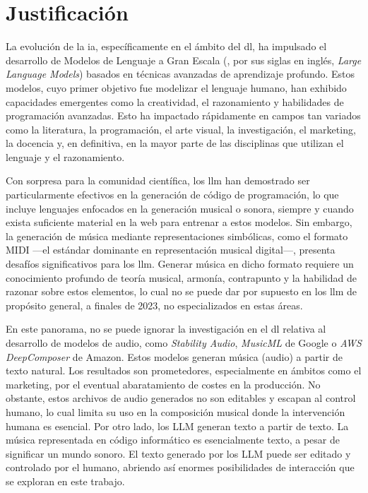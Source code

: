 \chapter{Justificación}

La evolución de la \gls{ia}, específicamente en el ámbito del \gls{dl}, ha impulsado el desarrollo de Modelos de Lenguaje a Gran Escala (, por sus siglas en inglés, \textit{Large Language Models}) basados en técnicas avanzadas de aprendizaje profundo. Estos modelos, cuyo primer objetivo fue modelizar el lenguaje humano, han exhibido capacidades emergentes como la creatividad, el razonamiento y habilidades de programación avanzadas. Esto ha impactado rápidamente en campos tan variados como la literatura, la programación, el arte visual, la investigación, el marketing, la docencia y, en definitiva, en la mayor parte de las disciplinas que utilizan el lenguaje y el razonamiento.

Con sorpresa para la comunidad científica, los \gls{llm} han demostrado ser particularmente efectivos en la generación de código de programación, lo que incluye lenguajes enfocados en la generación musical o sonora, siempre y cuando exista suficiente material en la web para entrenar a estos modelos. Sin embargo, la generación de música mediante representaciones simbólicas, como el formato MIDI —el estándar dominante en representación musical digital—, presenta desafíos significativos para los \gls{llm}. Generar música en dicho formato requiere un conocimiento profundo de teoría musical, armonía, contrapunto y la habilidad de razonar sobre estos elementos, lo cual no se puede dar por supuesto en los \gls{llm} de propósito general, a finales de 2023, no especializados en estas áreas.

En este panorama, no se puede ignorar la investigación en el \gls{dl} relativa al desarrollo de modelos de audio, como \textit{Stability Audio}, \textit{MusicML} de Google o \textit{AWS DeepComposer} de Amazon. Estos modelos generan música (audio) a partir de texto natural. Los resultados son prometedores, especialmente en ámbitos como el marketing, por el eventual abaratamiento de costes en la producción. No obstante, estos archivos de audio generados no son editables y escapan al control humano, lo cual limita su uso en la composición musical donde la intervención humana es esencial. Por otro lado, los LLM generan texto a partir de texto. La música representada en código informático es esencialmente texto, a pesar de significar un mundo sonoro. El texto generado por los LLM puede ser editado y controlado por el humano, abriendo así enormes posibilidades de interacción que se exploran en este trabajo.

